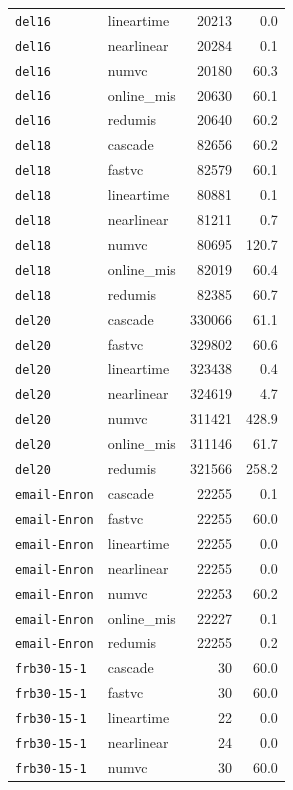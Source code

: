 \begin{longtable}{l l r r}
\texttt{del16} & lineartime & 20213 & 0.0 \\
\texttt{del16} & nearlinear & 20284 & 0.1 \\
\texttt{del16} & numvc & 20180 & 60.3 \\
\texttt{del16} & online\_mis & 20630 & 60.1 \\
\texttt{del16} & redumis & 20640 & 60.2 \\
\texttt{del18} & cascade & 82656 & 60.2 \\
\texttt{del18} & fastvc & 82579 & 60.1 \\
\texttt{del18} & lineartime & 80881 & 0.1 \\
\texttt{del18} & nearlinear & 81211 & 0.7 \\
\texttt{del18} & numvc & 80695 & 120.7 \\
\texttt{del18} & online\_mis & 82019 & 60.4 \\
\texttt{del18} & redumis & 82385 & 60.7 \\
\texttt{del20} & cascade & 330066 & 61.1 \\
\texttt{del20} & fastvc & 329802 & 60.6 \\
\texttt{del20} & lineartime & 323438 & 0.4 \\
\texttt{del20} & nearlinear & 324619 & 4.7 \\
\texttt{del20} & numvc & 311421 & 428.9 \\
\texttt{del20} & online\_mis & 311146 & 61.7 \\
\texttt{del20} & redumis & 321566 & 258.2 \\
\texttt{email-Enron} & cascade & 22255 & 0.1 \\
\texttt{email-Enron} & fastvc & 22255 & 60.0 \\
\texttt{email-Enron} & lineartime & 22255 & 0.0 \\
\texttt{email-Enron} & nearlinear & 22255 & 0.0 \\
\texttt{email-Enron} & numvc & 22253 & 60.2 \\
\texttt{email-Enron} & online\_mis & 22227 & 0.1 \\
\texttt{email-Enron} & redumis & 22255 & 0.2 \\
\texttt{frb30-15-1} & cascade & 30 & 60.0 \\
\texttt{frb30-15-1} & fastvc & 30 & 60.0 \\
\texttt{frb30-15-1} & lineartime & 22 & 0.0 \\
\texttt{frb30-15-1} & nearlinear & 24 & 0.0 \\
\texttt{frb30-15-1} & numvc & 30 & 60.0 \\

\end{longtable}
